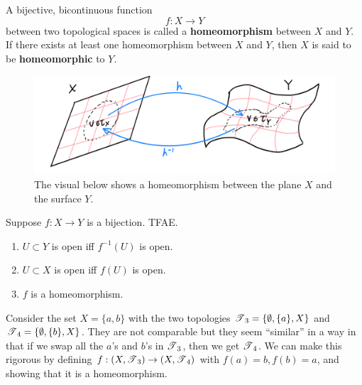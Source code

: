     \begin{definition}[Homeomorphism]
      A bijective, bicontinuous function 
      \begin{equation}
        f: X \longrightarrow Y
      \end{equation}
      between two topological spaces is called a \textbf{homeomorphism} between $X$ and $Y$. If there exists at least one homeomorphism between $X$ and $Y$, then $X$ is said to be \textbf{homeomorphic} to $Y$. 

      \begin{figure}[H]
        \centering 
        \includegraphics[scale=0.25]{img/Homeomorphism_of_Plane.PNG}
        \caption{The visual below shows a homeomorphism between the plane $X$ and the surface $Y$.}
        \label{fig:homeomorphism_plane}
      \end{figure}
    \end{definition}

    \begin{theorem}
      Suppose $f: X \rightarrow Y$ is a bijection. TFAE. 
      \begin{enumerate}
        \item $U \subset Y$ is open iff $f^{-1} (U)$ is open. 
        \item $U \subset X$ is open iff $f(U)$ is open. 
        \item $f$ is a homeomorphism. 
      \end{enumerate}
    \end{theorem} 

    \begin{example}
      Consider the set $X = \{a, b\}$ with the two topologies $\T_3 = \{\emptyset, \{a\}, X\}$ and $\T_4 = \{\emptyset, \{b\}, X\}$. They are not comparable but they seem ``similar'' in a way in that if we swap all the $a$'s and $b$'s in $\T_3$, then we get $\T_4$. We can make this rigorous by defining $f: (X, \T_3) \rightarrow (X, \T_4)$ with $f(a) = b, f(b) = a$, and showing that it is a homeomorphism. 
    \end{example}

